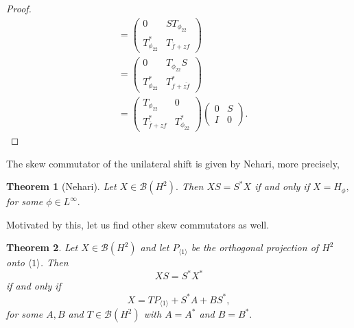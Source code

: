 \documentclass[12pt, reqno]{amsart}
\newtheorem{theorem}{Theorem}[section]
\theoremstyle{definition}
\theoremstyle{remark}
\numberwithin{equation}{section}
\begin{document}
\begin{proof}
\begin{align*}
             &=\begin{pmatrix}
             0&ST_{\phi_{22}}\\
             T^*_{\phi_{22}}&T_{\overline{f}+zf}
             \end{pmatrix}\\
             &=\begin{pmatrix}
             0&T_{\phi_{22}}S\\
             T^*_{\phi_{22}}&T^*_{f+\overline {zf}}
             \end{pmatrix}\\
             &=\begin{pmatrix}
                 T_{\phi_{22}}&0\\
                 T^*_{\overline{f}+zf}&T^*_{\phi_{22}}
             \end{pmatrix}
             \begin{pmatrix}
                 0&S\\
                I&0
            \end{pmatrix}.
         \end{align*}
        \end{proof}
    The skew commutator of the unilateral shift is given by Nehari, more precisely,
    \begin{theorem}[Nehari] Let $X \in \mathcal{B}(H^2).$ Then
        $XS=S^*X$ if and only if $X=H_{\phi},$ for some $\phi \in L^\infty.$\label{p-4}
    \end{theorem}
    Motivated by this, let us find other skew commutators as well.
        \begin{theorem}\label{th2}
        Let $X \in \mathcal{B}(H^2)$ and let $P_{\langle 1 \rangle }$ be the orthogonal projection of $H^2$ onto $\langle 1 \rangle$. Then
            $$XS=S^*X^*$$ if and only if
                  \begin{equation}\label{p-6}
                      X= TP_{\langle 1 \rangle }+S^*A+BS^*,
                  \end{equation}
        for some $A,B$ and $T \in \mathcal{B}(H^2)$ with $A=A^*$ and $B=B^*.$

        \end{theorem}
\end{document}
